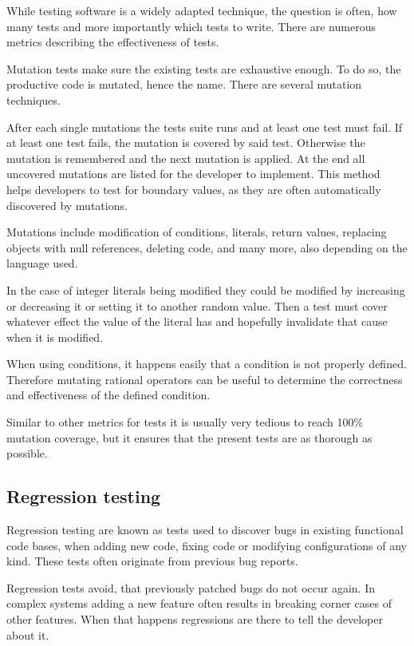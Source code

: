 While testing software is a widely adapted technique, the question is often,
how many tests and more importantly which tests to write. There are numerous
metrics describing the effectiveness of tests.

Mutation tests make sure the existing tests are exhaustive enough. To do so,
the productive code is mutated, hence the name. There are several mutation
techniques.

After each single mutations the tests suite runs and at least one test must
fail. If at least one test fails, the mutation is covered by said test.
Otherwise the mutation is remembered and the next mutation is applied. At the
end all uncovered mutations are listed for the developer to implement. This
method helps developers to test for boundary values, as they are often
automatically discovered by mutations.

Mutations include modification of conditions, literals, return values,
replacing objects with null references, deleting code, and many more, also
depending on the language used.

In the case of integer literals being modified they could be modified by
increasing or decreasing it or setting it to another random value. Then a test
must cover whatever effect the value of the literal has and hopefully
invalidate that cause when it is modified.

When using conditions, it happens easily that a condition is not properly
defined. Therefore mutating rational operators can be useful to determine the
correctness and effectiveness of the defined condition.

Similar to other metrics for tests it is usually very tedious to reach 100\%
mutation coverage, but it ensures that the present tests are as thorough as
possible.

\subsection{Regression testing}

Regression testing are known as tests used to discover bugs in existing
functional code bases, when adding new code, fixing code or modifying
configurations of any kind. These tests often originate from previous bug
reports.

Regression tests avoid, that previously patched bugs do not occur again. In
complex systems adding a new feature often results in breaking corner cases of
other features. When that happens regressions are there to tell the developer
about it.

